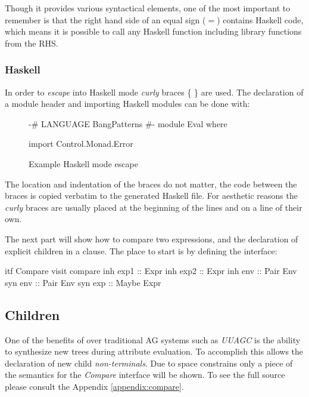 Though it provides various syntactical elements, one of the most important to remember is that the right hand side of an equal sign ($=$) contains Haskell code, which means it is possible to call any Haskell function including library functions from the RHS. 

\subsubsection{Haskell}
In order to \emph{escape} into Haskell mode \emph{curly} braces \{ \} are used. The declaration of a module header and importing Haskell modules can be done with:

\begin{figure}[!h]
\begin{code}
{
{-# LANGUAGE BangPatterns #-}
module Eval where

import Control.Monad.Error
}
\end{code}
\caption{Example Haskell mode escape}
\end{figure}

The location and indentation of the braces do not matter, the code between the braces is copied verbatim to the generated Haskell file. For aesthetic reasons the \emph{curly} braces are usually placed at the beginning of the lines and on a line of their own. 

The next part will show how to compare two expressions, and the declaration of  explicit children in a clause. The place to start is by defining the interface:

\begin{code}
itf Compare
  visit compare
    inh exp1  :: Expr
    inh exp2  :: Expr
    inh env   :: Pair Env
    syn env   :: Pair Env
    syn exp   :: Maybe Expr
\end{code}

\subsection{Children}
One of the benefits of \rcore over traditional AG systems such as \emph{UUAGC} is the ability to synthesize new trees during attribute evaluation. To accomplish this \rcore allows the declaration of new child \emph{non-terminals}. Due to space constrains only a piece of the semantics for the \emph{Compare} interface will be shown. To see the full source please consult the Appendix \ref{appendix:compare}.

